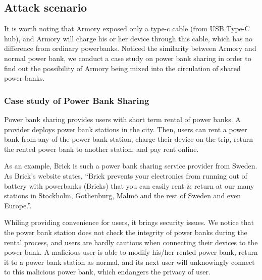 \subsection{Attack scenario}

It is worth noting that Armory exposed only a type-c cable (from USB Type-C hub),
and Armory will charge his or her device through this cable, which has no difference from ordinary powerbanks. Noticed the similarity between Armory and normal power bank, we conduct a case study on power bank sharing in order to find out the possibility of Armory being mixed into the circulation of shared power banks.
 
\subsubsection{Case study of Power Bank Sharing}

Power bank sharing provides users with short term rental of power banks. A provider deploys power bank stations in the city. Then, users can rent a power bank from any of the power bank station, charge their device on the trip, return the rented power bank to another station, and pay rent online.

As an example, Brick is such a power bank sharing service provider from Sweden. As Brick's website states, ``Brick prevents your electronics from running out of battery with powerbanks (Bricks) that you can easily rent \& return at our many stations in Stockholm, Gothenburg, Malmö and the rest of Sweden and even Europe.''. 



Whiling providing convenience for users, it brings security issues. We notice that the power bank station does not check the integrity of power banks during the rental process, and users are hardly cautious when connecting their devices to the power bank. A malicious user is able to modify his/her rented power bank, return it to a power bank station as normal, and its next user will unknowingly connect to this malicious power bank, which endangers the privacy of user.
